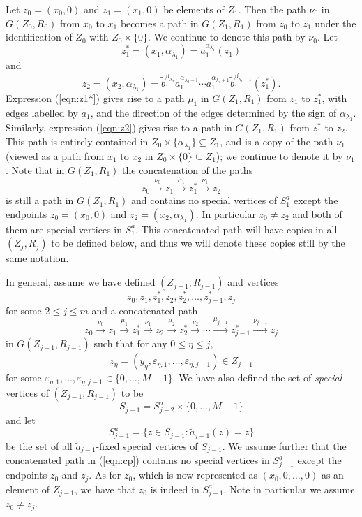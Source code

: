 \documentclass[11pt]{amsart}
\theoremstyle{definition}
\theoremstyle{definition}
\numberwithin{equation}{section}
\begin{document}
Let $z_0=(x_0,0)$ and $z_1=(x_1,0)$ be elements of $Z_1$. Then the path $\nu_0$ in $G(Z_0,R_0)$ from $x_0$ to $x_1$ becomes a path in $G(Z_1, R_1)$ from $z_0$ to $z_1$ under the identification of $Z_0$ with $Z_0\times\{0\}$. We continue to denote this path by $\nu_0$. Let 
\begin{equation}\label{eqn:z1*} z_1^*=(x_1,\alpha_{\lambda_1})=\tilde{a}_1^{\alpha_{\lambda_1}}(z_1) \end{equation}
and
\begin{equation}\label{eqn:z2} z_2=(x_2, \alpha_{\lambda_1})=\tilde{b}_1^{\beta_{\lambda_2}}\tilde{a}_1^{\alpha_{\lambda_2-1}}\cdots\tilde{a}_1^{\alpha_{\lambda_1+1}}\tilde{b}_1^{\beta_{\lambda_1+1}}(z_1^*). \end{equation}
Expression (\ref{eqn:z1*}) gives rise to a path $\mu_1$ in $G(Z_1, R_1)$ from $z_1$ to $z_1^*$, with edges labelled by $\tilde{a}_1$, and the direction of the edges determined by the sign of $\alpha_{\lambda_1}$. Similarly, expression (\ref{eqn:z2}) gives rise to a path in $G(Z_1, R_1)$ from $z_1^*$ to $z_2$. This path is entirely contained in $Z_0\times \{\alpha_{\lambda_1}\}\subseteq Z_1$, and is a copy of the path $\nu_1$ (viewed as a path from $x_1$ to $x_2$ in $Z_0\times\{0\}\subseteq Z_1$); we continue to denote it by $\nu_1$. Note that in $G(Z_1, R_1)$ the concatenation of the paths
$$ z_0\stackrel{\nu_0}{\longrightarrow} z_1\stackrel{\mu_1}{\longrightarrow}z_1^*\stackrel{\nu_1}{\longrightarrow}z_2 $$
is still a path in $G(Z_1, R_1)$ and contains no special vertices of $S_1^a$ except the endpoints $z_0=(x_0, 0)$ and $z_2=(x_2, \alpha_{\lambda_1})$. In particular $z_0\neq z_2$ and both of them are special vertices in $S_1^a$. This concatenated path will have copies in all $(Z_j, R_j)$ to be defined below, and thus we will denote these copies still by the same notation.

In general, assume we have defined $(Z_{j-1}, R_{j-1})$ and vertices $$z_0, z_1, z_1^*, z_2, z_2^*, \dots, z_{j-1}^*, z_{j}$$ for some $2\leq j\leq m$ and a concatenated path
\begin{equation}\label{eqn:cp} z_0\stackrel{\nu_0}{\longrightarrow} z_1\stackrel{\mu_1}{\longrightarrow}z_1^*\stackrel{\nu_1}{\longrightarrow}z_2\stackrel{\mu_2}{\longrightarrow}{z_2^*}\stackrel{\nu_2}{\longrightarrow}\cdots\stackrel{\mu_{j-1}}{\longrightarrow}z_{j-1}^*\stackrel{\nu_{j-1}}{\longrightarrow}z_{j} 
\end{equation}
in $G(Z_{j-1}, R_{j-1})$ such that for any $0\leq \eta\leq j$, 
$$z_{\eta}=(y_\eta, \varepsilon_{\eta,1},\dots, \varepsilon_{\eta, j-1})\in Z_{j-1}$$ for some $\varepsilon_{\eta,1}, \dots, \varepsilon_{\eta, j-1}\in \{0,\dots, M-1\}$. We have also defined the set of {\em special} vertices of $(Z_{j-1}, R_{j-1})$ to be 
$$ S_{j-1}=S_{j-2}^a\times \{0, \dots, M-1\} $$
and let
$$ S_{j-1}^a=\{z\in S_{j-1}\colon \tilde{a}_{j-1}(z)=z\} $$
be the set of all $\tilde{a}_{j-1}$-fixed special vertices of $S_{j-1}$. We assume further that the concatenated path in (\ref{eqn:cp}) contains no special vertices in $S_{j-1}^a$ except the endpoints $z_0$ and $z_j$. As for $z_0$, which is now represented as $(x_0, 0,\dots, 0)$ as an element of $Z_{j-1}$, we have that $z_0$ is indeed in $S_{j-1}^a$. Note in particular we assume $z_0\neq z_j$.
\end{document}
